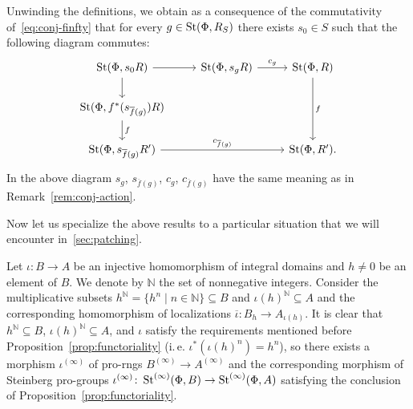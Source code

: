 \documentclass[oneside, 11pt]{amsart} \pdfoutput=1
\begin{document}
\begin{rem} \label{rem:functoriality}
 Unwinding the definitions, we obtain as a consequence of the commutativity of~\eqref{eq:conj-finfty} that for every $g \in \mathop{\mathrm{St}}\nolimits(\Phi, R_S)$ there exists $s_0 \in S$ such that the following diagram commutes:
 \[ \begin{tikzcd} \St(\Phi, s_0R) \ar{r} \ar{d} & \St(\Phi, s_g R) \ar{r}{c_{g}} & \St(\Phi, R) \ar{dd}{f} \\
                   \St(\Phi, f^*(s_{\overline{f}(g)})R) \ar{d}{f}   & & \\
                   \St(\Phi, s_{\overline{f}(g)} R')   \ar{rr}{c_{\overline{f}(g)}} & & \St(\Phi, R'). \end{tikzcd} \]
 In the above diagram $s_g$, $s_{\overline{f}(g)}$, $c_g$, $c_{\overline{f}(g)}$ have the same meaning as in Remark~\ref{rem:conj-action}.
\end{rem}

Now let us specialize the above results to a particular situation that we will encounter in~\cref{sec:patching}.

Let $\iota \colon B \to A$ be an injective homomorphism of integral domains and $h \neq 0$ be an element of $B$.
We denote by $\mathbb N$ the set of nonnegative integers.
Consider the multiplicative subsets $h^{\mathbb{N}} = \{ h^n \mid n \in \mathbb{N} \} \subseteq B$ and $\iota(h)^\mathbb{N} \subseteq A$ and the corresponding homomorphism of localizations $\overline{\iota} \colon B_h \to A_{\iota(h)}$.
It is clear that $h^\mathbb{N} \subseteq B$, $\iota(h)^\mathbb{N} \subseteq A$, and $\iota$ satisfy the requirements mentioned before Proposition~\ref{prop:functoriality} (i.\,e. $\iota^*(\iota(h)^n) = h^n$), so there exists a morphism $\iota^{(\infty)}$ of pro-rngs $B^{(\infty)} \to A^{(\infty)}$ and the corresponding morphism of Steinberg pro-groups $\iota^{(\infty)}\colon\mathop{\mathrm{St}}\nolimits^{(\infty)}(\Phi, B) \to \mathop{\mathrm{St}}\nolimits^{(\infty)}(\Phi, A)$ satisfying the conclusion of Proposition~\ref{prop:functoriality}.

\end{document}
